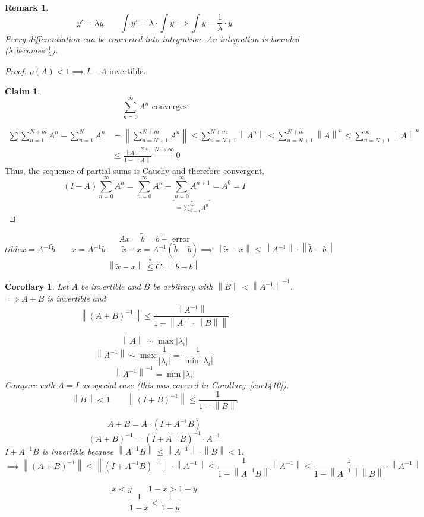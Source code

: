 \documentclass{article}
\newcounter{lecref}[section]
\numberwithin{lecref}{section}
\newtheorem*{claim}{Claim}
\newtheorem{remark}[lecref]{Remark}
\newtheorem{corollary}[lecref]{Corollary}
\newcommand{\norm}[1]{\left\|#1\right\|}
\newcommand{\card}[1]{\left|#1\right|}
\begin{document}
\begin{remark}
  \[ y' = \lambda y \qquad \int y' = \lambda \cdot \int y \implies \int y = \frac1{\lambda} \cdot y \]
  Every differentiation can be converted into integration. An integration is bounded ($\lambda$ becomes $\frac1{\lambda}$).
\end{remark}

\begin{proof}
  $\rho(A) < 1 \implies I - A$ invertible.
  \begin{claim}
    \[ \sum_{n=0}^\infty A^n \text{ converges} \]
  \end{claim}
  \begin{align*}
    \sum{\sum_{n=1}^{N+m} A^n - \sum_{n=1}^N A^n}
      &= \norm{\sum_{n=N+1}^{N+m} A^n} \leq \sum_{n=N+1}^{N+m} \norm{A^n} \leq \sum_{n=N+1}^{N+m} \norm{A}^n \leq \sum_{n=N+1}^\infty \norm{A}^n \\
      &\leq \frac{\norm{A}^{N+1}}{1 - \norm{A}} \xrightarrow{N \to \infty} 0
  \end{align*}
  Thus, the sequence of partial sums is Cauchy and therefore convergent.
  \[ (I - A) \sum_{n=0}^\infty A^n = \sum_{n=0}^\infty A^n - \underbrace{\sum_{n=0}^\infty A^{n+1}}_{= \sum_{n=1}^\infty A^n} = A^0 = I \]
\end{proof}

\[ Ax = \tilde b = b + \text{ error} \]
\[ tilde x = A^{-1} \tilde b \qquad x = A^{-1} b \qquad \tilde x - x = A^{-1} (\tilde b - b) \implies \norm{\tilde x - x} \leq \norm{A^{-1}} \cdot \norm{\tilde b - b} \]
\[ \norm{\tilde x - x} \overset{\text{?}}\leq C \cdot \norm{\tilde b - b} \]

\begin{corollary} %
  Let $A$ be invertible and $B$ be arbitrary with $\norm{B} < \norm{A^{-1}}^{-1}$.
  $\implies A + B$ is invertible and
  \[ \norm{(A + B)^{-1}} \leq \frac{\norm{A^{-1}}}{1 - \norm{A^{-1} \cdot \norm{B}}} \]

  \[ \norm{A} \sim \max\card{\lambda_i} \]
  \[ \norm{A^{-1}} \sim \max\frac{1}{\card{\lambda_i}} = \frac{1}{\min\card{\lambda_i}} \]
  \[ \norm{A^{-1}}^{-1} = \min\card{\lambda_i} \]
  Compare with $A = I$ as special case (this was covered in Corollary~\ref{cor1410}).
  \[ \norm{B} < 1 \qquad \norm{(I + B)^{-1}} \leq \frac{1}{1 - \norm{B}} \]

  \[ A + B = A \cdot (I + A^{-1} B) \]
  \[ (A + B)^{-1} = (I + A^{-1} B)^{-1} \cdot A^{-1} \]
  $I + A^{-1} B$ is invertible because $\norm{A^{-1} B} \leq \norm{A^{-1}} \cdot \norm{B} < 1$.
  \[ \implies \norm{(A + B)^{-1}} \leq \norm{(I + A^{-1} B)^{-1}} \cdot \norm{A^{-1}} \leq \frac{1}{1 - \norm{A^{-1} B}} \norm{A^{-1}} \leq \frac{1}{1 - \norm{A^{-1}} \norm{B}} \cdot \norm{A^{-1}} \]

  \[ x < y \qquad 1 - x > 1 - y \]
  \[ \frac{1}{1 - x} < \frac{1}{1 - y} \]
\end{corollary}
\end{document}
